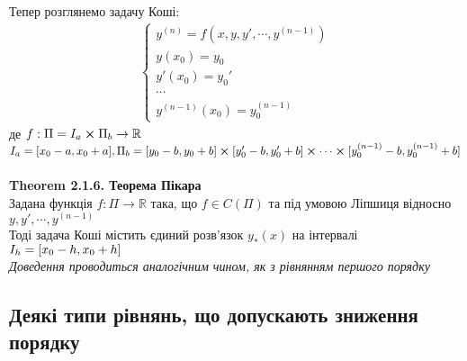\documentclass[a4paper, 14pt]{extarticle}
\def\th#1{\textbf{Theorem {#1}}}
\def\bigline{\vspace{5mm}\\}
\begin{document}
	\bigline
	Тепер розглянемо задачу Коші:
	\begin{align*}
	\begin{cases}
	\displaystyle y^{(n)} = f(x,y,y',\cdots,y^{(n-1)})\\
	y(x_0)=y_0\\
	y'(x_0) = y_0'\\
	\cdots\\
	y^{(n-1)}(x_0) = y_0^{(n-1)}
	\end{cases}
	\end{align*}
	де $f: \Pi = I_a \cross \Pi_b \rightarrow \mathbb{R}$\\
	$I_a = [x_0 - a, x_0 + a], \\ \Pi_b = [y_0 -b, y_0+b] \cross [y_0'-b,y_0'+b] \cross \cdots \cross [y_0^{(n-1)}-b, y_0^{(n-1)}+b]$\\
	\\
	\th{2.1.6. Теорема Пікара}\\
	Задана функція $f: \Pi \rightarrow \mathbb{R}$ така, що $f \in C(\Pi)$ та під умовою Ліпшиця відносно $y,y',\cdots,y^{(n-1)}$\\
	Тоді задача Коші містить єдиний розв'язок $y_*(x)$ на інтервалі $\\I_h = [x_0-h, x_0+h]$\\
	\textit{Доведення проводиться аналогічним чином, як з рівнянням першого порядку}\\
	\subsection{Деякі типи рівнянь, що допускають зниження порядку}
\end{document}

